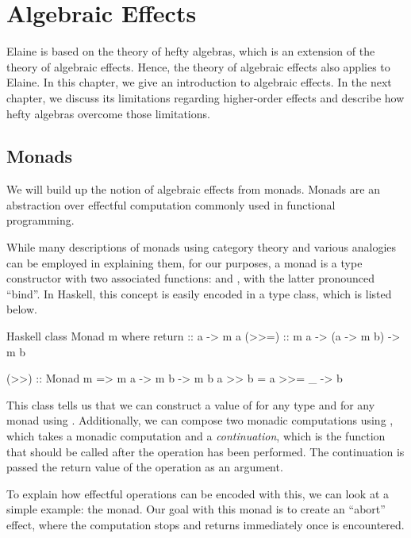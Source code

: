 \chapter{Algebraic Effects}\label{chap:algebraic_effects}

Elaine is based on the theory of hefty algebras, which is an extension of the theory of algebraic effects. Hence, the theory of algebraic effects also applies to Elaine. In this chapter, we give an introduction to algebraic effects. In the next chapter, we discuss its limitations regarding higher-order effects and describe how hefty algebras overcome those limitations.

\section{Monads}


We will build up the notion of algebraic effects from monads. Monads are an abstraction over effectful computation commonly used in functional programming.

While many descriptions of monads using category theory and various analogies can be employed in explaining them, for our purposes, a monad is a type constructor  with two associated functions:  and \hs{>>=}, with the latter pronounced ``bind''. In Haskell, this concept is easily encoded in a type class, which is listed below.

\begin{lst}{Haskell}
class Monad m where
  return :: a -> m a
  (>>=) :: m a -> (a -> m b) -> m b

(>>) :: Monad m => m a -> m b -> m b
a >> b = a >>= \_ -> b
\end{lst}

This class tells us that we can construct a value of  for any type  and for any monad  using . Additionally, we can compose two monadic computations using \hs{>>=}, which takes a monadic computation and a \emph{continuation}, which is the function that should be called after the operation has been performed. The continuation is passed the return value of the operation as an argument.

To explain how effectful operations can be encoded with this, we can look at a simple example: the  monad. Our goal with this monad is to create an ``abort'' effect, where the computation stops and returns immediately once  is encountered.

